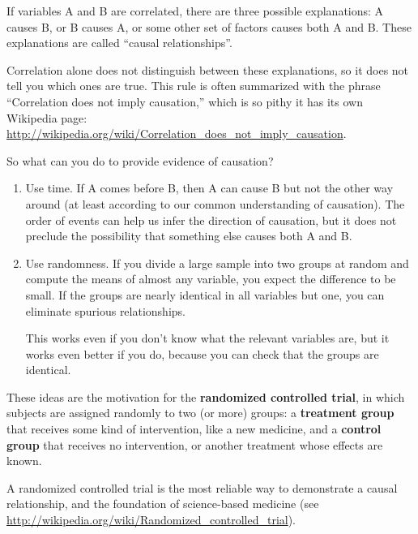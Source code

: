 If variables A and B are correlated, there are three possible
explanations: A causes B, or B causes A, or some other set of factors
causes both A and B.  These explanations are called ``causal
relationships''.

Correlation alone does not distinguish between these explanations,
so it does not tell you which ones are true.
This rule is often summarized with the phrase ``Correlation
does not imply causation,'' which is so pithy it has its own
Wikipedia page: \url{http://wikipedia.org/wiki/Correlation_does_not_imply_causation}.

So what can you do to provide evidence of causation?

\begin{enumerate}

\item Use time.  If A comes before B, then A can cause B but not the
  other way around (at least according to our common understanding of
  causation).  The order of events can help us infer the direction
  of causation, but it does not preclude the possibility that something
  else causes both A and B.

\item Use randomness.  If you divide a large sample into two
  groups at random and compute the means of almost any variable, you
  expect the difference to be small.
  If the groups are nearly identical in all variables but one, you
  can eliminate spurious relationships.

  This works even if you don't know what the relevant variables
  are, but it works even better if you do, because you can check that
  the groups are identical.

\end{enumerate}

These ideas are the motivation for the {\bf randomized controlled
trial}, in which subjects are assigned randomly to two (or more)
groups: a {\bf treatment group} that receives some kind of intervention,
like a new medicine, and a {\bf control group} that receives
no intervention, or another treatment whose effects are known.

A randomized controlled trial is the most reliable way to demonstrate
a causal relationship, and the foundation of science-based medicine
(see \url{http://wikipedia.org/wiki/Randomized_controlled_trial}).

